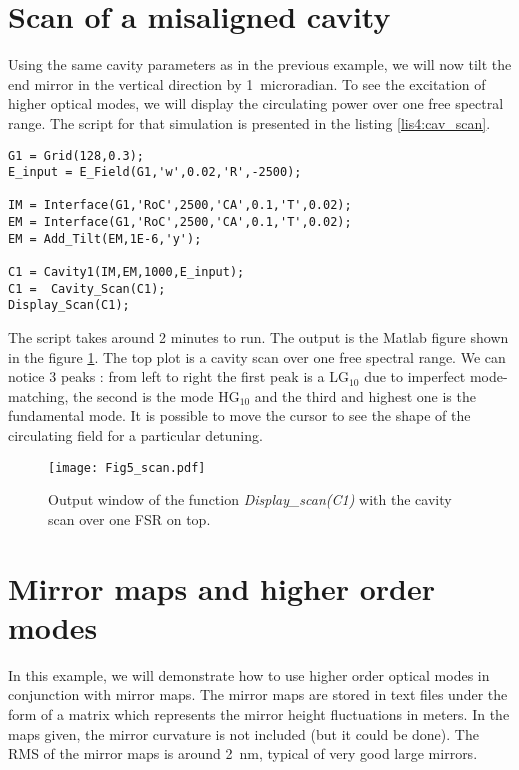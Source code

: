 \section{Scan of a misaligned cavity}

Using the same cavity parameters as in the previous example, we will now tilt the end mirror in the vertical direction by 1~microradian. To see the excitation of higher optical modes, we will display the circulating power over one free spectral range. The script for that simulation is presented in the listing \ref{lis4:cav_scan}.

\begin{lstlisting}[float=htp,caption=Example of OSCAR script to scan a cavity \label{lis4:cav_scan},frame=lines]
G1 = Grid(128,0.3);
E_input = E_Field(G1,'w',0.02,'R',-2500);

IM = Interface(G1,'RoC',2500,'CA',0.1,'T',0.02);
EM = Interface(G1,'RoC',2500,'CA',0.1,'T',0.02);
EM = Add_Tilt(EM,1E-6,'y');

C1 = Cavity1(IM,EM,1000,E_input);
C1 =  Cavity_Scan(C1);
Display_Scan(C1);
\end{lstlisting}

The script takes around 2 minutes to run. The output is the Matlab figure shown in the figure \ref{fig4:scan}. The top plot is a cavity scan over one free spectral range. We can notice 3 peaks : from left to right the first peak is a LG$_{10}$ due to imperfect mode-matching, the second is the mode HG$_{10}$ and the third and highest one is the fundamental mode. It is possible to move the cursor to see the shape of the circulating field for a particular detuning.

\begin{figure}
\begin{center}
\texttt{[image: Fig5\_scan.pdf]}
\end{center}
\caption{\label{fig4:scan} Output window of the function \emph{Display\_scan(C1)} with the cavity scan over one FSR on top.}
\end{figure}

\section{Mirror maps and higher order modes}

In this example, we will demonstrate how to use higher order optical modes in conjunction with mirror maps. The mirror maps are stored in text files under the form of a matrix which represents the mirror height fluctuations in meters. In the maps given, the mirror curvature is not included (but it could be done). The RMS of the mirror maps is around 2~nm, typical of very good large mirrors.

